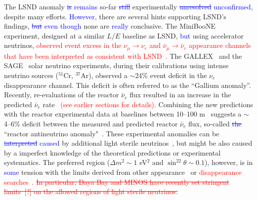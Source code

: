 \documentclass[aps,twocolumn,preprintnumbers,amsmath,superscriptaddress,amssymb,floats,nofootinbib]{revtex4-1}
\begin{document}
The LSND anomaly \textcolor{blue}{\st{is} remains} so-far \textcolor{blue}{\st{still}} experimentally \textcolor{blue}{\st{unresolved} unconfirmed}, despite many efforts. 
\textcolor{blue}{However,} there are several hints supporting LSND's findings, \textcolor{blue}{\st{but} even though} none are \textcolor{blue}{really} conclusive.
The MiniBooNE experiment, designed at a similar $L/E$ baseline as LSND,
\textcolor{blue}{but} using accelerator neutrinos, \textcolor{red}{observed event excess 
in the $\nu_{\mu}\rightarrow\nu_e$ and $\bar\nu_{\mu}\rightarrow\bar\nu_e$ appearance channels that have been interpreted as consistent with LSND~\cite{MiniBooNE2007,MiniBooNE2013}.} 
The GALLEX~\cite{GALLEX2010} and the SAGE~\cite{SAGE2009} solar neutrino experiments, during their calibrations using intense neutrino sources ($^{51}$Cr, $^{37}$Ar), observed a $\sim$24\% event deficit in the $\nu_e$ disappearance channel. 
This deficit is often referred to as the ``Gallium anomaly''. 
Recently, re-evaluations of the reactor $\bar\nu_e$ flux resulted in an increase in the predicted $\bar\nu_e$ rate~\cite{Mueller, Huber} \textcolor{red}{(see earlier sections for details).} 
Combining the new predictions with the reactor experimental data at baselines between 10--100 m~\cite{ILL,Gosgen,Rovno,Krasnoyarsk,SRP,Bugey4,Bugey3} suggests a $\sim$4--6\% deficit between the measured and predicted reactor $\bar\nu_e$ flux, so-called 
\textcolor{blue}{\st{the}} ``reactor antineutrino anomaly"~\cite{Mention,Zhang13}. 
These experimental anomalies can be \textcolor{blue}{\st{interpreted} caused} by additional light sterile neutrinos~\cite{Guinti2011}, 
but might  be also caused by a imperfect knowledge of the theoretical predictions or experimental systematics.  
The preferred region ($\Delta{m}^2\sim1$ eV$^2$ and $\sin^22\theta\sim0.1$), however, is in \textcolor{blue}{some} tension with the limits derived from other appearance~\cite{KARMEN2002,NOMAD03,OPERA13,ICARUS13} or \textcolor{red}{disappearance searches~\cite{Stockdale84,Dydak84,MiniBooNE12-nubar,MiniBooNE12-nu,SuperK2000,MINOS11-NC,Bugey3,Conrad12,Sousa-Neutrino14,DayaBaySterile}.} \textcolor{red}{\st{In particular, Daya Bay and MINOS have recently set stringent limits~[?] on the allowed regions of light sterile neutrinos.}}
\end{document}

